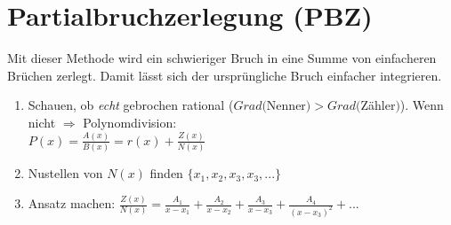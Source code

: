 \section{Partialbruchzerlegung (PBZ)}
Mit dieser Methode wird ein schwieriger Bruch in eine Summe von einfacheren
Brüchen zerlegt. Damit lässt sich der ursprüngliche Bruch einfacher integrieren.

\begin{enumerate}
	\item Schauen, ob \textit{echt} gebrochen rational 
	($Grad($Nenner$) > Grad($Zähler$)$). Wenn nicht $\Rightarrow$ Polynomdivision: \\
		$P(x) = \frac{A(x)}{B(x)} = r(x) + \frac{Z(x)}{N(x)}$
	\item Nustellen von $N(x)$ finden $\{x_1, x_2, x_3, x_3, ...\}$
	\item Ansatz machen: $\frac{Z(x)}{N(x)} = \frac{A_1}{x - x_1} + \frac{A_2}{x-x_2} 
		+ \frac{A_3}{x-x_3} + \frac{A_4}{(x-x_3)^2} + ...$
	
\end{enumerate}



